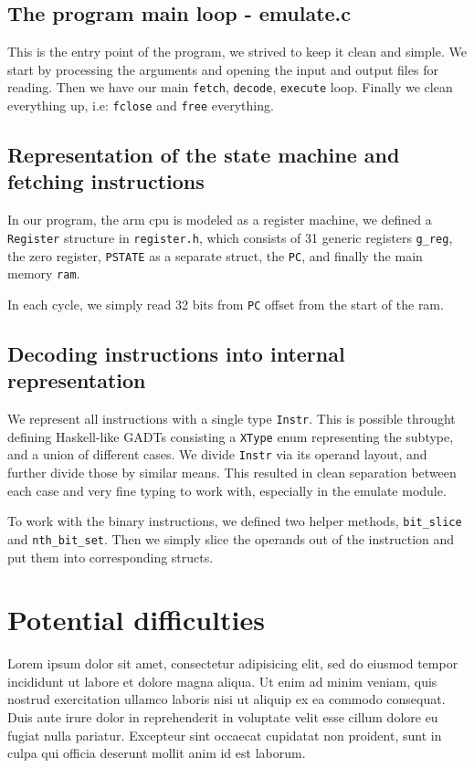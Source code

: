\documentclass[11pt]{article}
\begin{document}
\subsection{The program main loop - emulate.c}
This is the entry point of the program, we strived to keep it clean and simple. 
We start by processing the arguments and opening the input and output files for
reading. Then we have our main \texttt{fetch}, \texttt{decode}, 
\texttt{execute} loop. Finally we clean everything up, i.e: \texttt{fclose} and
\texttt{free} everything.

\subsection{Representation of the state machine and fetching instructions}

In our program, the arm cpu is modeled as a register machine, we defined a
\texttt{Register} structure in \texttt{register.h}, which consists of 31
generic registers \texttt{g\_reg}, the zero register, \texttt{PSTATE} as a
separate struct, the \texttt{PC}, and finally the main memory \texttt{ram}.

In each cycle, we simply read 32 bits from \texttt{PC} offset from the start of
the ram.

\subsection{Decoding instructions into internal representation}

We represent all instructions with a single type \texttt{Instr}. This is 
possible throught defining Haskell-like GADTs consisting a \texttt{XType} enum
representing the subtype, and a union of different cases. We divide
\texttt{Instr} via its operand layout, and further divide those by similar 
means. This resulted in clean separation between each case and very fine typing
to work with, especially in the emulate module.

To work with the binary instructions, we defined two helper methods,
\texttt{bit\_slice} and \texttt{nth\_bit\_set}. Then we simply slice the
operands out of the instruction and put them into corresponding structs.

\section{Potential difficulties}
Lorem ipsum dolor sit amet, consectetur adipisicing elit, sed do eiusmod tempor
incididunt ut labore et dolore magna aliqua. Ut enim ad minim veniam, quis
nostrud exercitation ullamco laboris nisi ut aliquip ex ea commodo consequat.
Duis aute irure dolor in reprehenderit in voluptate velit esse cillum dolore eu
fugiat nulla pariatur. Excepteur sint occaecat cupidatat non proident, sunt in
culpa qui officia deserunt mollit anim id est laborum.
\end{document}
